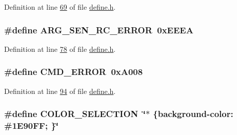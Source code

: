 Definition at line \hyperlink{a00034_source_l00069}{69} of file \hyperlink{a00034_source}{define.\+h}.

\hypertarget{a00034_a2663000c914acad476f44813681c6b5e}{
\subsubsection[{A\+R\+G\+\_\+\+S\+E\+N\+\_\+\+R\+C\+\_\+\+E\+R\+R\+O\+R}]{\setlength{\rightskip}{0pt plus 5cm}\#define A\+R\+G\+\_\+\+S\+E\+N\+\_\+\+R\+C\+\_\+\+E\+R\+R\+O\+R~0x\+E\+E\+E\+A}}\label{a00034_a2663000c914acad476f44813681c6b5e}


Definition at line \hyperlink{a00034_source_l00078}{78} of file \hyperlink{a00034_source}{define.\+h}.

\hypertarget{a00034_a1764a522e9c1a59a59be8757c69fa494}{
\subsubsection[{C\+M\+D\+\_\+\+E\+R\+R\+O\+R}]{\setlength{\rightskip}{0pt plus 5cm}\#define C\+M\+D\+\_\+\+E\+R\+R\+O\+R~0x\+A008}}\label{a00034_a1764a522e9c1a59a59be8757c69fa494}


Definition at line \hyperlink{a00034_source_l00094}{94} of file \hyperlink{a00034_source}{define.\+h}.

\hypertarget{a00034_ab32e4b2a4ecbb271c28640764ed4824c}{
\subsubsection[{C\+O\+L\+O\+R\+\_\+\+S\+E\+L\+E\+C\+T\+I\+O\+N}]{\setlength{\rightskip}{0pt plus 5cm}\#define C\+O\+L\+O\+R\+\_\+\+S\+E\+L\+E\+C\+T\+I\+O\+N~\char`\"{}$\ast$ \{background-\/color\+: \#1\+E90\+F\+F; \}\char`\"{}}}\label{a00034_ab32e4b2a4ecbb271c28640764ed4824c}


